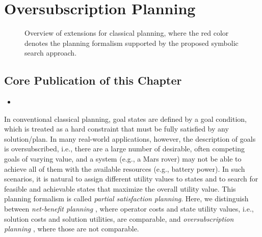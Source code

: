 \chapter{Oversubscription Planning}\label{ch:osp}

\renewcommand{\kiviatGoal}{2}
\begin{figure}[t]
    \begin{center}
        
    \end{center}
    \caption[Overview of extension for classical planning (goal description).]{Overview of extensions for classical planning, where the red color denotes the planning formalism supported by the proposed symbolic search approach.}
    \label{fig:goal_description:kiviat}
\end{figure}
\renewcommand{\kiviatGoal}{1}

\section*{Core Publication of this Chapter}
\renewcommand{\citebf}[1]{\textbf{#1}}
\begin{itemize}
    \item {}
\end{itemize}
\renewcommand{\citebf}[1]{#1}

In conventional classical planning, goal states are defined by a goal condition, which is treated as a hard constraint that must be fully satisfied by any solution/plan.
In many real-world applications, however, the description of goals is oversubscribed, i.e., there are a large number of desirable, often competing goals of varying value, and a system (e.g., a Mars rover) may
not be able to achieve all of them with the available resources (e.g., battery power).
In such scenarios, it is natural to assign different utility values to states and to search for feasible and achievable states that maximize the overall utility value.
This planning formalism is called \emph{partial satisfaction planning}. Here, we distinguish between \emph{net-benefit planning} \autocite{vandenbriel-et-al-aaai2004}, where operator costs and state utility values, i.e., solution costs and solution utilities, are comparable, and \emph{oversubscription planning} \autocite{smith-icaps2004}, where those are not comparable. 

